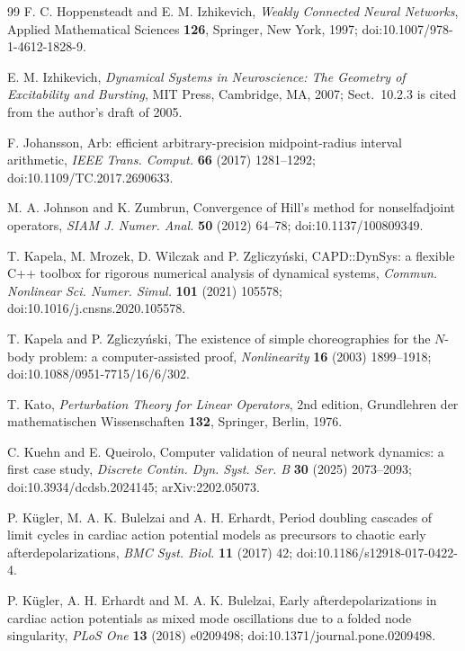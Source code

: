 \documentclass[11pt]{article}
\theoremstyle{definition}
\begin{document}
\begin{thebibliography}{99}
 F. C. Hoppensteadt and E. M. Izhikevich, \emph{Weakly Connected Neural Networks}, Applied Mathematical Sciences \textbf{126}, Springer, New York, 1997; doi:10.1007/978-1-4612-1828-9.

 E. M. Izhikevich, \emph{Dynamical Systems in Neuroscience: The Geometry of Excitability and Bursting}, MIT Press, Cambridge, MA, 2007; Sect.~10.2.3 is cited from the author's draft of 2005.

 F. Johansson, Arb: efficient arbitrary-precision midpoint-radius interval arithmetic, \emph{IEEE Trans. Comput.} \textbf{66} (2017) 1281--1292; doi:10.1109/TC.2017.2690633.

 M. A. Johnson and K. Zumbrun, Convergence of Hill's method for nonselfadjoint operators, \emph{SIAM J. Numer. Anal.} \textbf{50} (2012) 64--78; doi:10.1137/100809349.

 T. Kapela, M. Mrozek, D. Wilczak and P. Zgliczy\'nski, CAPD::DynSys: a flexible C++ toolbox for rigorous numerical analysis of dynamical systems, \emph{Commun. Nonlinear Sci. Numer. Simul.} \textbf{101} (2021) 105578; doi:10.1016/j.cnsns.2020.105578.

 T. Kapela and P. Zgliczy\'nski, The existence of simple choreographies for the $N$-body problem: a computer-assisted proof, \emph{Nonlinearity} \textbf{16} (2003) 1899--1918; doi:10.1088/0951-7715/16/6/302.

 T. Kato, \emph{Perturbation Theory for Linear Operators}, 2nd edition, Grundlehren der mathematischen Wissenschaften \textbf{132}, Springer, Berlin, 1976.

 C. Kuehn and E. Queirolo, Computer validation of neural network dynamics: a first case study, \emph{Discrete Contin. Dyn. Syst. Ser. B} \textbf{30} (2025) 2073--2093; doi:10.3934/dcdsb.2024145; arXiv:2202.05073.

 P. K\"ugler, M. A. K. Bulelzai and A. H. Erhardt, Period doubling cascades of limit cycles in cardiac action potential models as precursors to chaotic early afterdepolarizations, \emph{BMC Syst. Biol.} \textbf{11} (2017) 42; doi:10.1186/s12918-017-0422-4.

 P. K\"ugler, A. H. Erhardt and M. A. K. Bulelzai, Early afterdepolarizations in cardiac action potentials as mixed mode oscillations due to a folded node singularity, \emph{PLoS One} \textbf{13} (2018) e0209498; doi:10.1371/journal.pone.0209498.


\end{thebibliography}
\end{document}
